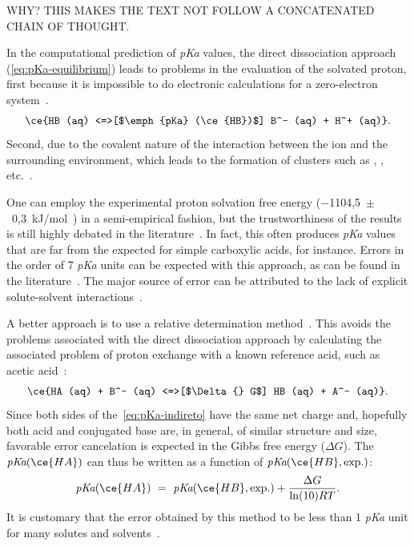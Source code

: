 WHY?\@
THIS MAKES THE TEXT NOT FOLLOW A CONCATENATED CHAIN OF THOUGHT.\@

In the computational prediction of \emph{pKa} values,
the direct dissociation approach (\cref{eq:pKa-equilibrium})
leads to problems in the evaluation of the solvated proton,
first because it is impossible to do electronic calculations for a zero-electron
system~\cite{Ding_2009,Sumon_2012}.
%
\begin{equation}
	\ce{HB (aq) <=>[$\emph{pKa} (\ce{HB})$] B^- (aq) + H^+ (aq)}\text{.}
	\label{eq:pKa-equilibrium}
\end{equation}
%
Second, due to the covalent nature of the interaction between the  ion
and the surrounding environment, which leads to the formation of clusters such
as , , etc.~\cite{Sumon_2012}.

One can employ the experimental proton solvation free energy
($-$1104,5~$\pm$~0,3~kJ/mol~\cite{Tissandier_1998,Marenich_2009}) in a
semi-empirical fashion, but the trustworthiness of the results is still highly
debated in the literature~\cite{Yang_2013}.
In fact, this often produces \emph{pKa} values that are far from the expected
for simple carboxylic acids, for instance.
Errors in the order of 7 \emph{pKa} units can be expected with this approach,
as can be found in the literature~\cite{Pliego_2002,Ding_2009}.
The major source of error can be attributed to the lack of explicit
solute-solvent interactions~\cite{Pliego_2002}.

A better approach is to use a relative determination method~\cite{Ding_2009}.
This avoids the problems associated with the direct dissociation approach
by calculating the associated problem of proton exchange with a known reference
acid, such as acetic acid~\cite{Goldberg_2002}:
%
\begin{equation}
	\ce{HA (aq) + B^- (aq) <=>[$\Delta{} G$] HB (aq) + A^- (aq)}\text{.}
	\label{eq:pKa-indireto}
\end{equation}
%
Since both sides of the~\cref{eq:pKa-indireto}
have the same net charge and, hopefully both acid and conjugated base are, in
general, of similar structure and size, favorable error cancelation is expected
in the Gibbs free energy ($\Delta G$).
The $\emph{pKa}(\ce{HA})$
can thus be written as a function of $\emph{pKa}(\ce{HB}, \text{exp.})$:
%
\begin{equation}
	\emph{pKa}(\ce{HA})~=~\emph{pKa}(\ce{HB}, \text{exp.}) + \frac{\Delta G}{\ln(10) R T}\text{.}
\end{equation}
%
It is customary that the error obtained by this method to be less than 1 \emph{pKa}
unit for many solutes and solvents~\cite{Ding_2009}.

